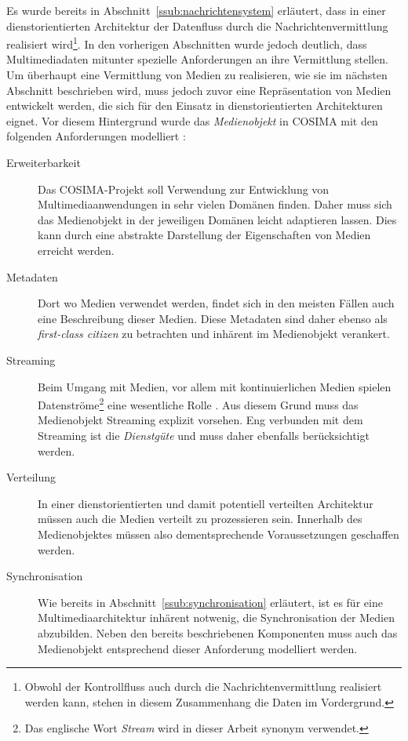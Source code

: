   Es wurde bereits in Abschnitt~\ref{ssub:nachrichtensystem} erläutert, dass in einer dienstorientierten Architektur der Datenfluss durch die Nachrichtenvermittlung realisiert wird\footnote{Obwohl der Kontrollfluss auch durch die Nachrichtenvermittlung realisiert werden kann, stehen in diesem Zusammenhang die Daten im Vordergrund.}. In den vorherigen Abschnitten wurde jedoch deutlich, dass Multimediadaten mitunter spezielle Anforderungen an ihre Vermittlung stellen. Um überhaupt eine Vermittlung von Medien zu realisieren, wie sie im nächsten Abschnitt beschrieben wird, muss jedoch zuvor eine Repräsentation von Medien entwickelt werden, die sich für den Einsatz in dienstorientierten Architekturen eignet. Vor diesem Hintergrund wurde das \emph{Medienobjekt} in COSIMA mit den folgenden Anforderungen modelliert \citep[S. 34]{bericht}:
  
  \begin{description}
    \item[Erweiterbarkeit] Das COSIMA-Projekt soll Verwendung zur Entwicklung von Multimediaanwendungen in sehr vielen Domänen finden. Daher muss sich das Medienobjekt in der jeweiligen Domänen leicht adaptieren lassen. Dies kann durch eine abstrakte Darstellung der Eigenschaften von Medien erreicht werden.
    \item[Metadaten] Dort wo Medien verwendet werden, findet sich in den meisten Fällen auch eine Beschreibung dieser Medien. Diese Metadaten sind daher ebenso als \emph{first-class citizen} zu betrachten und inhärent im Medienobjekt verankert.
    \item[Streaming] Beim Umgang mit Medien, vor allem mit kontinuierlichen Medien spielen Datenströme\footnote{Das englische Wort \emph{Stream} wird in dieser Arbeit synonym verwendet.} eine wesentliche Rolle \citep[S. 14ff]{multimedia_technologie}. Aus diesem Grund muss das Medienobjekt Streaming explizit vorsehen. Eng verbunden mit dem Streaming ist die \emph{Dienstgüte} \citep{multimedia_technologie} und muss daher ebenfalls berücksichtigt werden.
    \item[Verteilung] In einer dienstorientierten und damit potentiell verteilten Architektur müssen auch die Medien verteilt zu prozessieren sein. Innerhalb des Medienobjektes müssen also dementsprechende Voraussetzungen geschaffen werden.
    \item[Synchronisation] Wie bereits in Abschnitt~\ref{ssub:synchronisation} erläutert, ist es für eine Multimediaarchitektur inhärent notwenig, die Synchronisation der Medien abzubilden. Neben den bereits beschriebenen Komponenten muss auch das Medienobjekt entsprechend dieser Anforderung modelliert werden.
  \end{description}


